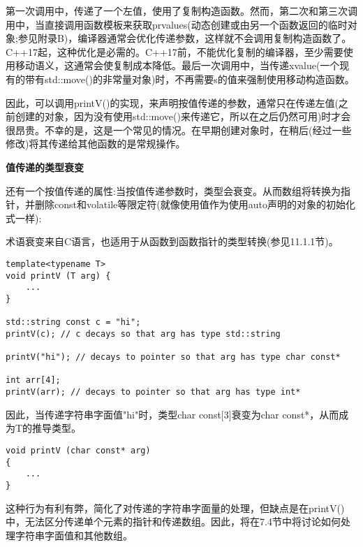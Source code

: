 第一次调用中，传递了一个左值，使用了复制构造函数。然而，第二次和第三次调用中，当直接调用函数模板来获取prvalues(动态创建或由另一个函数返回的临时对象;参见附录B)，编译器通常会优化传递参数，这样就不会调用复制构造函数了。C++17起，这种优化是必需的。C++17前，不能优化复制的编译器，至少需要使用移动语义，这通常会使复制成本降低。最后一次调用中，当传递xvalue(一个现有的带有std::move()的非常量对象)时，不再需要s的值来强制使用移动构造函数。

因此，可以调用printV()的实现，来声明按值传递的参数，通常只在传递左值(之前创建的对象，因为没有使用std::move()来传递它，所以在之后仍然可用)时才会很昂贵。不幸的是，这是一个常见的情况。在早期创建对象时，在稍后(经过一些修改)将其传递给其他函数的是常规操作。

\noindent
\textbf{值传递的类型衰变}

还有一个按值传递的属性:当按值传递参数时，类型会衰变。从而数组将转换为指针，并删除const和volatile等限定符(就像使用值作为使用auto声明的对象的初始化式一样):

\begin{tcolorbox}[colback=webgreen!5!white,colframe=webgreen!75!black]
\hspace*{0.75cm}术语衰变来自C语言，也适用于从函数到函数指针的类型转换(参见11.1.1节)。
\end{tcolorbox}

\begin{lstlisting}[style=styleCXX]
template<typename T>
void printV (T arg) {
	...
}

std::string const c = "hi";
printV(c); // c decays so that arg has type std::string

printV("hi"); // decays to pointer so that arg has type char const*

int arr[4];
printV(arr); // decays to pointer so that arg has type int*
\end{lstlisting}

因此，当传递字符串字面值"hi"时，类型char const[3]衰变为char const*，从而成为T的推导类型。

\begin{lstlisting}[style=styleCXX]
void printV (char const* arg)
{
	...
}
\end{lstlisting}

这种行为有利有弊，简化了对传递的字符串字面量的处理，但缺点是在printV()中，无法区分传递单个元素的指针和传递数组。因此，将在7.4节中将讨论如何处理字符串字面值和其他数组。




